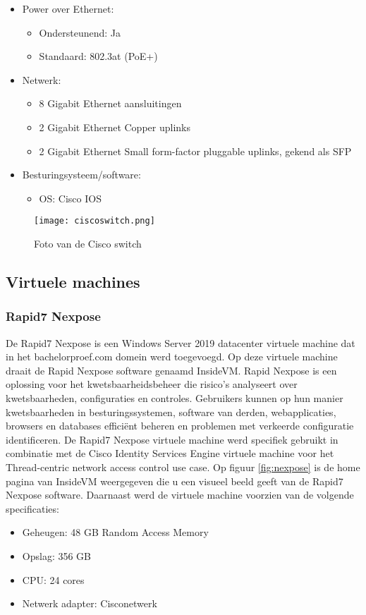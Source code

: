 \begin{itemize}
	\item Power over Ethernet:
	\begin{itemize}
		\item Ondersteunend: Ja
		\item Standaard: 802.3at (PoE+)
	\end{itemize}
	\item Netwerk:
	\begin{itemize}
		\item 8 Gigabit Ethernet aansluitingen
		\item 2 Gigabit Ethernet Copper uplinks
		\item 2 Gigabit Ethernet Small form-factor pluggable uplinks, gekend als SFP
	\end{itemize}
	\item Besturingsysteem/software:
	\begin{itemize}
		\item OS: Cisco IOS
    \end{itemize}
\end{itemize}

\begin{figure}[H]
	\centering
	\texttt{[image: ciscoswitch.png]}
	\caption{Foto van de Cisco switch}
	\label{fig:switch}
\end{figure}

\subsection{Virtuele machines}
\subsubsection{Rapid7 Nexpose}
De Rapid7 Nexpose is een Windows Server 2019 datacenter virtuele machine dat in het bachelorproef.com domein werd toegevoegd. Op deze virtuele machine draait de Rapid Nexpose software genaamd InsideVM. Rapid Nexpose is een oplossing voor het kwetsbaarheidsbeheer die risico's analyseert over kwetsbaarheden, configuraties en controles. Gebruikers kunnen op hun manier kwetsbaarheden in besturingssystemen, software van derden, webapplicaties, browsers en databases efficiënt beheren en problemen met verkeerde configuratie identificeren. De Rapid7 Nexpose virtuele machine werd specifiek gebruikt in combinatie met de Cisco Identity Services Engine virtuele machine voor het Thread-centric network access control use case. Op figuur \ref{fig:nexpose} is de home pagina van InsideVM weergegeven die u een visueel beeld geeft van de Rapid7 Nexpose software.
\newline\newline
Daarnaast werd de virtuele machine voorzien van de volgende specificaties: 
\begin{itemize}
	\item Geheugen: 48 GB Random Access Memory
	\item Opslag: 356 GB
	\item CPU: 24 cores
	\item Netwerk adapter: Cisco\textunderscore netwerk
\end{itemize}

